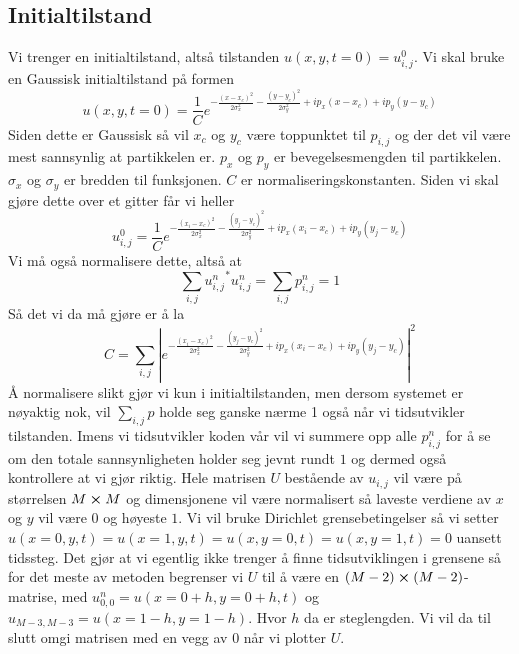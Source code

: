 \documentclass[reprint,english,notitlepage]{revtex4-2}  %
\begin{document}
\subsection{Initialtilstand}
\label{ssec:Init}
Vi trenger en initialtilstand, altså tilstanden $u(x,y,t=0)=u^0_{i,j}$. Vi skal bruke en Gaussisk initialtilstand på formen
$$
u(x,y,t=0)=\frac{1}{C}e^{-\frac{(x-x_c)^2}{2\sigma_x^2}-\frac{(y-y_c)^2}{2\sigma_y^2}+ip_x(x-x_c)+ip_y(y-y_c)}
$$
Siden dette er Gaussisk så vil $x_c$ og $y_c$ være toppunktet til $p_{i,j}$ og der det vil være mest sannsynlig at partikkelen er. $p_x$ og $p_y$ er bevegelsesmengden til partikkelen. $\sigma_x$ og $\sigma_y$ er bredden til funksjonen. $C$ er normaliseringskonstanten. Siden vi skal gjøre dette over et gitter får vi heller
$$
u_{i,j}^0=\frac{1}{C}e^{-\frac{(x_i-x_c)^2}{2\sigma_x^2}-\frac{(y_j-y_c)^2}{2\sigma_y^2}+ip_x(x_i-x_c)+ip_y(y_j-y_c)}
$$
Vi må også normalisere dette, altså at 
$$\sum_{i,j} {u^n_{i,j}}^*u^n_{i,j}=\sum_{i,j}p^n_{i,j}=1$$
Så det vi da må gjøre er å la
$$
C=\sum_{i,j}|e^{-\frac{(x_i-x_c)^2}{2\sigma_x^2}-\frac{(y_j-y_c)^2}{2\sigma_y^2}+ip_x(x_i-x_c)+ip_y(y_j-y_c)}|^2
$$
Å normalisere slikt gjør vi kun i initialtilstanden, men dersom systemet er nøyaktig nok, vil $\sum_{i,j}p$ holde seg ganske nærme 1 også når vi tidsutvikler tilstanden. Imens vi tidsutvikler koden vår vil vi summere opp alle $p^n_{i,j}$ for å se om den totale sannsynligheten holder seg jevnt rundt $1$ og dermed også kontrollere at vi gjør riktig.
\newline Hele matrisen $U$ bestående av $u_{i,j}$ vil være på størrelsen $M\cross M$ og dimensjonene vil være normalisert så laveste verdiene av $x $ og $y$ vil være $0$ og høyeste $1$. Vi vil bruke Dirichlet grensebetingelser så vi setter $u(x=0,y, t)=u(x=1,y, t)=u(x, y=0, t)=u(x,y=1, t)=0$ uansett tidssteg. Det gjør at vi egentlig ikke trenger å finne tidsutviklingen i grensene så for det meste av metoden begrenser vi $U$ til å være en $(M-2)\cross (M-2)$-matrise, med $u_{0,0}^n=u(x=0+h,y=0+h, t)$ og $u_{M-3,M-3}=u(x=1-h,y=1-h)$. Hvor $h$ da er steglengden. Vi vil da til slutt omgi matrisen med en vegg av $0$ når vi plotter $U$.
\end{document}
